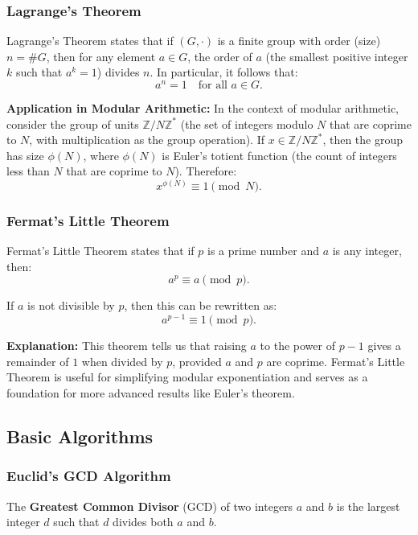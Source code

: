 \subsubsection{Lagrange's Theorem}
Lagrange's Theorem states that if \((G, \cdot)\) is a finite group with order (size) \(n = \#G\), then for any element \(a \in G\), the order of \(a\) (the smallest positive integer \(k\) such that \(a^k = 1\)) divides \(n\). In particular, it follows that:
\[
a^n = 1 \quad \text{for all } a \in G.
\]

\textbf{Application in Modular Arithmetic:}  
In the context of modular arithmetic, consider the group of units \(\mathbb{Z}/N\mathbb{Z}^*\) (the set of integers modulo \(N\) that are coprime to \(N\), with multiplication as the group operation). If \(x \in \mathbb{Z}/N\mathbb{Z}^*\), then the group has size \(\phi(N)\), where \(\phi(N)\) is Euler's totient function (the count of integers less than \(N\) that are coprime to \(N\)). Therefore:
\[
x^{\phi(N)} \equiv 1 \pmod{N}.
\]

\subsubsection{Fermat's Little Theorem}
Fermat's Little Theorem states that if \(p\) is a prime number and \(a\) is any integer, then:
\[
a^p \equiv a \pmod{p}.
\]

If \(a\) is not divisible by \(p\), then this can be rewritten as:
\[
a^{p-1} \equiv 1 \pmod{p}.
\]

\textbf{Explanation:}  
This theorem tells us that raising \(a\) to the power of \(p-1\) gives a remainder of \(1\) when divided by \(p\), provided \(a\) and \(p\) are coprime. Fermat's Little Theorem is useful for simplifying modular exponentiation and serves as a foundation for more advanced results like Euler's theorem.

\subsection{Basic Algorithms}

\subsubsection{Euclid's GCD Algorithm}

The \textbf{Greatest Common Divisor} (GCD) of two integers \(a\) and \(b\) is the largest integer \(d\) such that \(d\) divides both \(a\) and \(b\). \\

